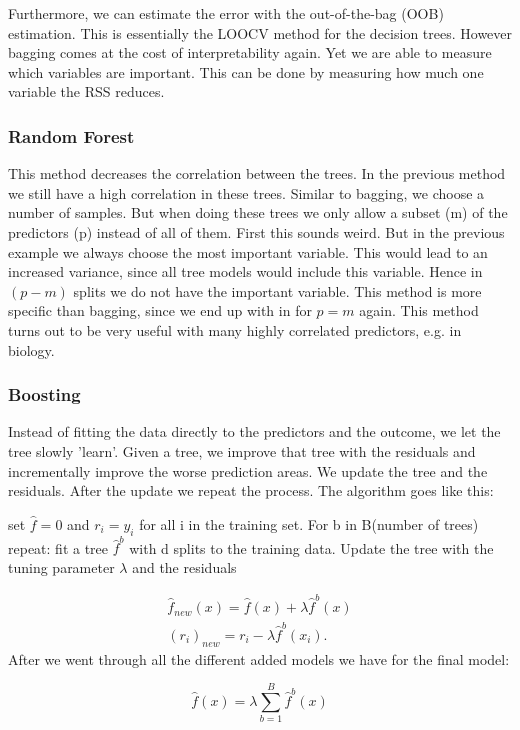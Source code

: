 \documentclass{article}
\begin{document}
Furthermore, we can estimate the error with the out-of-the-bag (OOB) estimation. This is essentially the LOOCV method for the decision trees. However bagging comes at the cost of interpretability again. Yet we are able to measure which variables are important. This can be done by measuring how much one variable the RSS reduces.

\subsubsection{Random Forest}

This method decreases the correlation between the trees. In the previous method we still have a high correlation in these trees. Similar to bagging, we choose a number of samples. But when doing these trees we only allow a subset (m) of the predictors (p) instead of all of them. First this sounds weird. But in the previous example we always choose the most important variable. This would lead to an increased variance, since all tree models would include this variable. Hence in $(p-m)$ splits we do not have the important variable. This method is more specific than bagging, since we end up with in for $p=m$ again. This method turns out to be very useful with many highly correlated predictors, e.g. in biology.

\subsubsection{Boosting}

Instead of fitting the data directly to the predictors and the outcome, we let the tree slowly 'learn'. Given a tree, we improve that tree with the residuals and incrementally improve the worse prediction areas. We update the tree and the residuals. After the update we repeat the process. The algorithm goes like this:

set $\hat{f}=0$ and $r_i=y_i$ for all i in the training set. For b in B(number of trees) repeat: fit a tree $\hat{f}^b$ with d splits to the training data. Update the tree with the tuning parameter $\lambda$ and the residuals 

\begin{gather}
    \hat{f}_{new}(x) = \hat{f}(x)+ \lambda \hat{f}^b(x) \\
    (r_i)_{new}=r_i - \lambda \hat{f}^b (x_i).
\end{gather}
After we went through all the different added models we have for the final model:

\begin{equation}
    \hat{f}(x) = \lambda \sum _{b=1}^B \hat{f}^b(x)
\end{equation}
\end{document}
